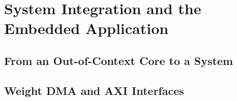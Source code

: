 %
\chapter{System Integration and the Embedded Application}
\label{chap:integration}

\section{From an Out-of-Context Core to a System}
\label{sec:ooc-to-system}

\section{Weight DMA and AXI Interfaces}
\label{sec:dma}

